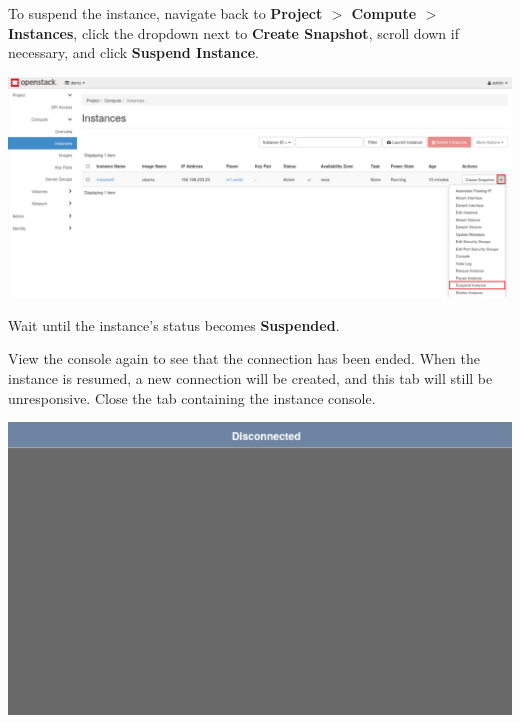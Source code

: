 \documentclass[letterpaper, 12pt]{article}
\begin{document}
\begin{enumerate}
    \begin{labstep}
        To suspend the instance, navigate back to \textbf{Project $>$ Compute $>$ Instances}, click the dropdown next to \textbf{Create Snapshot}, scroll down if necessary, and click \textbf{Suspend Instance}.

        \begin{center}
            \includegraphics[width=\linewidth]{images/part3/step13.png}
        \end{center}
    \end{labstep}

    \begin{stopbox}
        Wait until the instance's status becomes \textbf{Suspended}.
    \end{stopbox}

    \begin{labstep}
        View the console again to see that the connection has been ended.
        When the instance is resumed, a new connection will be created, and this tab will still be unresponsive.
        Close the tab containing the instance console.

        \begin{center}
            \includegraphics[width=\linewidth]{images/part3/step14.png}
        \end{center}
    \end{labstep}


\end{enumerate}
\end{document}
